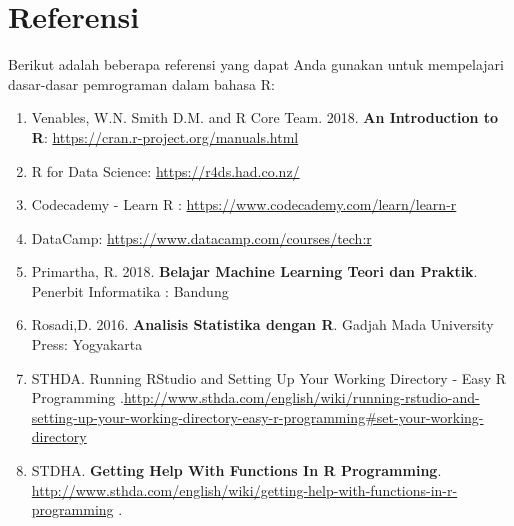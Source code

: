\documentclass[
]{book}
\providecommand{\tightlist}{%
  \setlength{\itemsep}{0pt}\setlength{\parskip}{0pt}}
\begin{document}
\hypertarget{referensi}{%
\chapter{Referensi}\label{referensi}}

Berikut adalah beberapa referensi yang dapat Anda gunakan untuk mempelajari dasar-dasar pemrograman dalam bahasa R:

\begin{enumerate}
\def\labelenumi{\arabic{enumi}.}
\tightlist
\item
  Venables, W.N. Smith D.M. and R Core Team. 2018. \textbf{An Introduction to R}: \url{https://cran.r-project.org/manuals.html}
\item
  R for Data Science: \url{https://r4ds.had.co.nz/}
\item
  Codecademy - Learn R : \url{https://www.codecademy.com/learn/learn-r}
\item
  DataCamp: \url{https://www.datacamp.com/courses/tech:r}
\item
  Primartha, R. 2018. \textbf{Belajar Machine Learning Teori dan Praktik}. Penerbit Informatika : Bandung
\item
  Rosadi,D. 2016. \textbf{Analisis Statistika dengan R}. Gadjah Mada University Press: Yogyakarta
\item
  STHDA. Running RStudio and Setting Up Your Working Directory - Easy R Programming .\url{http://www.sthda.com/english/wiki/running-rstudio-and-setting-up-your-working-directory-easy-r-programming\#set-your-working-directory}
\item
  STDHA. \textbf{Getting Help With Functions In R Programming}. \url{http://www.sthda.com/english/wiki/getting-help-with-functions-in-r-programming} .
\end{enumerate}

  
\end{document}
